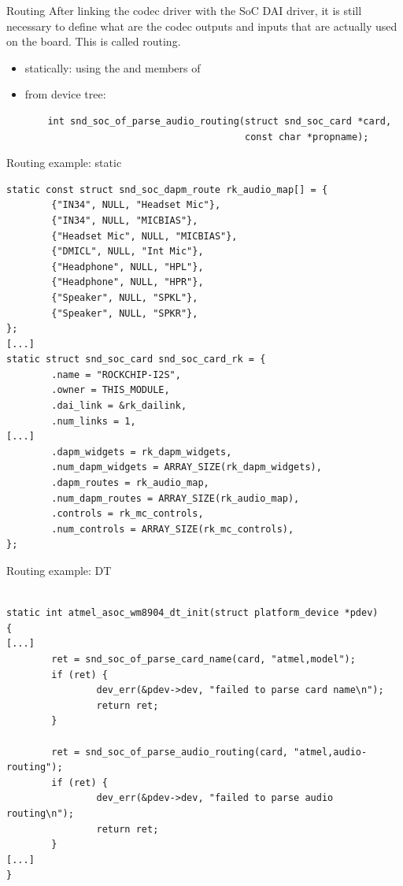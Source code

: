 \begin{frame}[fragile]{Routing}
  After linking the codec driver with the SoC DAI driver, it is still
  necessary to define what are the codec outputs and inputs that are
  actually used on the board. This is called routing.

  \begin{itemize}
  \item statically: using the  and
     members of 
  \item from device tree:
    \begin{verbatim}
    int snd_soc_of_parse_audio_routing(struct snd_soc_card *card,
                                       const char *propname);
    \end{verbatim}
  \end{itemize}
\end{frame}

\begin{frame}[fragile]{Routing example: static}
  \begin{block}{}
    \fontsize{8}{8}\selectfont
    \begin{verbatim}
static const struct snd_soc_dapm_route rk_audio_map[] = {
        {"IN34", NULL, "Headset Mic"},
        {"IN34", NULL, "MICBIAS"},
        {"Headset Mic", NULL, "MICBIAS"},
        {"DMICL", NULL, "Int Mic"},
        {"Headphone", NULL, "HPL"},
        {"Headphone", NULL, "HPR"},
        {"Speaker", NULL, "SPKL"},
        {"Speaker", NULL, "SPKR"},
};
[...]
static struct snd_soc_card snd_soc_card_rk = {
        .name = "ROCKCHIP-I2S",
        .owner = THIS_MODULE,
        .dai_link = &rk_dailink,
        .num_links = 1,
[...]
        .dapm_widgets = rk_dapm_widgets,
        .num_dapm_widgets = ARRAY_SIZE(rk_dapm_widgets),
        .dapm_routes = rk_audio_map,
        .num_dapm_routes = ARRAY_SIZE(rk_audio_map),
        .controls = rk_mc_controls,
        .num_controls = ARRAY_SIZE(rk_mc_controls),
};
    \end{verbatim}
  \end{block}
\end{frame}

\begin{frame}[fragile]{Routing example: DT}
  \begin{block}{}
    \fontsize{10}{10}\selectfont
    \begin{verbatim}

static int atmel_asoc_wm8904_dt_init(struct platform_device *pdev)
{
[...]
        ret = snd_soc_of_parse_card_name(card, "atmel,model");
        if (ret) {
                dev_err(&pdev->dev, "failed to parse card name\n");
                return ret;
        }

        ret = snd_soc_of_parse_audio_routing(card, "atmel,audio-routing");
        if (ret) {
                dev_err(&pdev->dev, "failed to parse audio routing\n");
                return ret;
        }
[...]
}
    \end{verbatim}
  \end{block}
\end{frame}

